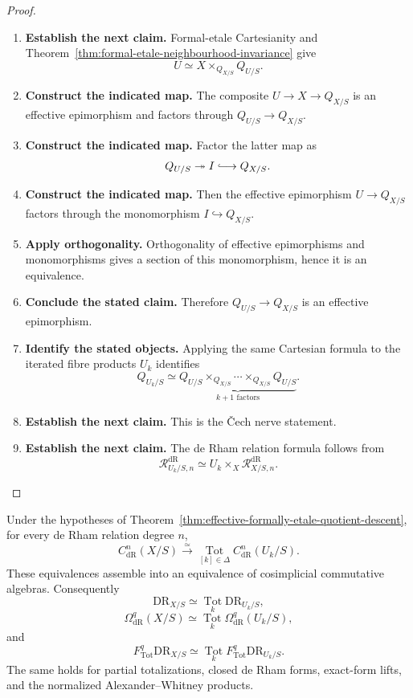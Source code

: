 \begin{proof}
\leavevmode
\begin{enumerate}[label=\textup{(\arabic*)}]
    \item \textbf{Establish the next claim.}
    Formal-etale Cartesianity and
    Theorem~\ref{thm:formal-etale-neighbourhood-invariance} give
    \[
    U
    \simeq
    X\times_{Q_{X/S}}Q_{U/S}.
    \]
    \item \textbf{Construct the indicated map.}
    The composite \(U\to X\to Q_{X/S}\) is an effective epimorphism and factors through
    \(Q_{U/S}\to Q_{X/S}\).
    \item \textbf{Construct the indicated map.}
    Factor the latter map as
    \[
    Q_{U/S}\twoheadrightarrow I\lhook\joinrel\longrightarrow Q_{X/S}.
    \]
    \item \textbf{Construct the indicated map.}
    Then the effective epimorphism \(U\to Q_{X/S}\) factors through the monomorphism
    \(I\hookrightarrow Q_{X/S}\).
    \item \textbf{Apply orthogonality.}
    Orthogonality of effective epimorphisms and
    monomorphisms gives a section of this monomorphism, hence it is an equivalence.
    \item \textbf{Conclude the stated claim.}
    Therefore \(Q_{U/S}\to Q_{X/S}\) is an effective epimorphism.
    \item \textbf{Identify the stated objects.}
    Applying the same Cartesian
    formula to the iterated fibre products \(U_k\) identifies
    \[
    Q_{U_k/S}
    \simeq
    \underbrace{
    Q_{U/S}\times_{Q_{X/S}}\cdots\times_{Q_{X/S}}Q_{U/S}
    }_{k+1\text{ factors}}.
    \]
    \item \textbf{Establish the next claim.}
    This is the \v{C}ech nerve statement.
    \item \textbf{Establish the next claim.}
    The de Rham relation formula follows from
    \[
    \mathcal R^{\mathrm{dR}}_{U_k/S,n}
    \simeq
    U_k\times_X\mathcal R^{\mathrm{dR}}_{X/S,n}.
    \]
\end{enumerate}
\end{proof}

\begin{theorem}
\label{thm:effective-descent-cochain-tower-expanded}
Under the hypotheses of
Theorem~\ref{thm:effective-formally-etale-quotient-descent}, for every de Rham relation degree
\(n\),
\[
  C^n_{\mathrm{dR}}(X/S)
  \xrightarrow{\simeq}
  \operatorname*{Tot}_{[k]\in\Delta}
  C^n_{\mathrm{dR}}(U_k/S).
\]
These equivalences assemble into an equivalence of cosimplicial commutative algebras.
Consequently
\[
  \mathrm{DR}_{X/S}
  \simeq
  \operatorname*{Tot}_k\mathrm{DR}_{U_k/S},
\]
\[
  \Omega^q_{\mathrm{dR}}(X/S)
  \simeq
  \operatorname*{Tot}_k\Omega^q_{\mathrm{dR}}(U_k/S),
\]
and
\[
  F^q_{\mathrm{Tot}}\mathrm{DR}_{X/S}
  \simeq
  \operatorname*{Tot}_k
  F^q_{\mathrm{Tot}}\mathrm{DR}_{U_k/S}.
\]
The same holds for partial totalizations, closed de Rham forms, exact-form
lifts, and the normalized Alexander--Whitney products.
\end{theorem}

